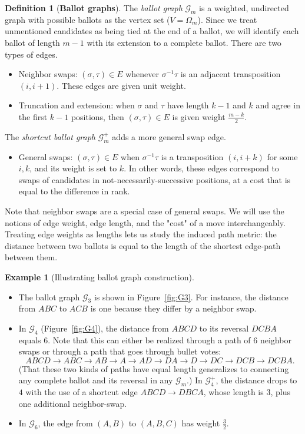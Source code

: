 \documentclass{amsart}
\newcommand{\G}{\mathcal{G}}
\theoremstyle{plain}
\theoremstyle{definition}
\newtheorem{definition}[theorem]{Definition}
\newtheorem{example}[theorem]{Example}
\theoremstyle{remark}
\begin{document}
\begin{definition}[\textbf{Ballot graphs}]
The {\em ballot graph} $\G_m$ is a weighted, undirected graph with possible ballots as the vertex set ($V=\Omega_m$).  
Since we treat unmentioned candidates as being tied at the end of a ballot, we will identify each ballot of length $m-1$ with its extension to a complete ballot.
There are two types of edges.
\begin{itemize}
\item Neighbor swaps: $(\sigma,\tau)\in E$ 
whenever $\sigma^{-1}\tau$ is an adjacent transposition $(i,i+1)$. These edges are given unit weight.
\item Truncation and extension: 
when $\sigma$ and $\tau$ have length $k-1$ and $k$ and agree in the first $k-1$ positions, then 
$(\sigma,\tau)\in E$ 
is given weight $\frac{m-k}2$.  
\end{itemize}
The {\em shortcut ballot graph} $\mathcal G_m^+$ adds a more general swap edge.
\begin{itemize}
    \item General swaps: $(\sigma,\tau)\in E$  when
    $\sigma^{-1}\tau$ is a transposition $(i,i+k)$ for some $i,k$, and its weight is set to $k$.  In other words, these edges correspond to swaps of candidates in not-necessarily-successive positions, at a cost that is equal to the difference in rank. 
\end{itemize}
\end{definition}

Note that neighbor swaps are a special case of general swaps.
We will use the notions of edge weight, edge length, and the "cost" of a move interchangeably.  Treating edge weights as lengths lets us study the induced path metric:  the distance between two ballots is equal to the length of the shortest edge-path between them.


\begin{example}[Illustrating ballot graph construction] \

\begin{itemize}
    \item The ballot graph $\G_3$ is shown in Figure~\ref{fig:G3}.  For instance, the distance from $ABC$ to $ACB$ is one because they differ by a neighbor swap.
\item In $\G_4$ (Figure~\ref{fig:G4}), the distance from $ABCD$ to its reversal $DCBA$ equals $6$.  Note that this can either be realized through a path of 6 neighbor swaps or through a path that goes through bullet votes:
$$ABCD\rightarrow ABC\rightarrow AB\rightarrow A \rightarrow
 AD \rightarrow DA\rightarrow D \rightarrow DC \rightarrow DCB \rightarrow DCBA.$$
 (That these two kinds of paths have equal length generalizes to connecting any complete ballot and its reversal in any $\G_m$.)  In $\G_4^+$, the distance drops to $4$ with the use of a shortcut edge $ABCD\to DBCA$, whose length is 3, plus one additional neighbor-swap.
\item In $\G_6$, the edge from $(A,B)$ to $(A,B,C)$ has weight $\frac{3}{2}$.  
\end{itemize}
\end{example}
\end{document}
